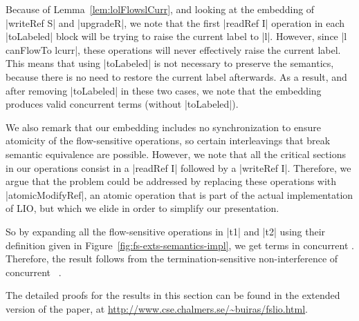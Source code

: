 \begin{proofsketch} Because of Lemma~\ref{lem:lolFlowslCurr}, and
  looking at the embedding of |writeRef S| and |upgradeR|, we note
  that the first |readRef I| operation in each |toLabeled| block will
  be trying to raise the current label to |l|. However, since |l
  canFlowTo lcurr|, these operations will never effectively raise the
  current label. This means that using |toLabeled| is not necessary to
  preserve the semantics, because there is no need to restore the
  current label afterwards. As a result, and after removing
  |toLabeled| in these two cases, we note that the embedding produces
  valid concurrent \lio{} terms (without |toLabeled|).

  We also remark that our embedding includes no synchronization to
  ensure atomicity of the flow-sensitive operations, so certain
  interleavings that break semantic equivalence are possible. However,
  we note that all the critical sections in our operations consist in
  a |readRef I| followed by a |writeRef I|. Therefore, we argue that
  the problem could be addressed by replacing these operations with
  |atomicModifyRef|, an atomic operation that is part of the actual
  implementation of LIO, but which we elide in order to simplify our
  presentation.

  So by expanding all the flow-sensitive operations in |t1| and |t2|
  using their definition given in
  Figure~\ref{fig:fs-exts-semantics-impl}, we get terms in concurrent
  \lio{}.  Therefore, the result follows from the
  termination-sensitive non-interference of concurrent
  \lio{}~\citep{stefan:addressing-covert}.
\end{proofsketch}

The detailed proofs for the results in this section can be found in
the extended version of the paper, at
\url{http://www.cse.chalmers.se/~buiras/fslio.html}.


